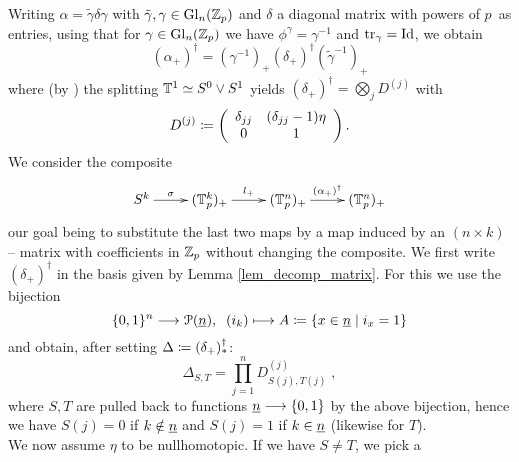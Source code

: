   \begin{rem}\label{rem_dagger_as_matrix}
    Writing $\alpha = \tilde\gamma \delta \gamma$ with $\tilde\gamma,\gamma \in
    \operatorname{Gl}_n(\mathbb{Z}_p)$ and $\delta$ a diagonal matrix with powers of $p\,$ as
    entries, using that for $\gamma \in \operatorname{Gl}_n(\mathbb{Z}_p)$ we have $\phi^\gamma =
    \gamma^{-1}$ and $\mathrm{tr}_\gamma = \mathrm{Id}$, we obtain%
    \begin{displaymath}
      (\alpha_+)^\dagger = (\gamma^{-1})_+ (\delta_+)^\dagger (\tilde\gamma^{-1})_+
    \end{displaymath}
    where (by \cite[Corollary 3.16]{carlsson2011higher}) the splitting $\mathbb{T}^1
    \simeq S^0 \vee S^1$ yields $(\delta_+)^\dagger = \bigotimes_j D^{(j)}$
    with
    \begin{equation}\label{eq_diag_dagger}
      D^{(j)} \coloneqq \left( 
        \begin{array}{cc} 
          \delta_{jj} & (\delta_{jj} - 1) \eta \\
          0 & 1 \\
        \end{array} 
      \right).
    \end{equation}
    We consider the composite%
    \begin{displaymath}
      \xymatrix{
        S^k \ar[r]^-{\sigma} &%
        (\sT^k_p)_+ \ar[r]^-{l_+} &%
        (\sT^n_p)_+ \ar[r]^-{(\alpha_+)^\dagger} &%
        (\sT^n_p)_+%
      }%
    \end{displaymath}
    our goal being to substitute the last two maps by a map induced by an $(n
    \times k)$ -- matrix with coefficients in $\mathbb{Z}_p$ without changing the
    composite. We first write $(\delta_+)^\dagger$ in the basis given by Lemma
    \ref{lem_decomp_matrix}. For this we use the bijection
    \begin{displaymath}
      \{0,1\}^n \longrightarrow \mathcal{P}(\underline{n}),\;\; (i_k) \longmapsto A \coloneqq \{ x \in \underline{n} \mid i_x = 1 \}
    \end{displaymath}
    and obtain, after setting $\Delta \coloneqq (\delta_+)^\dagger_*$:
    \begin{displaymath}
      \Delta_{S,T} = \prod_{j=1}^n D^{(j)}_{S(j),T(j)}\;,
    \end{displaymath}
    where $S,T$ are pulled back to functions $\underline{n} \longrightarrow \{0,1\}$ by the above
    bijection, hence we have $S(j) = 0$ if $k \notin \underline{n}$ and $S(j) = 1$ if
    $k \in \underline{n}$ (likewise for $T$).\\
    We now assume $\eta$ to be nullhomotopic. If we have $S \neq T$, we pick a

\end{rem}
